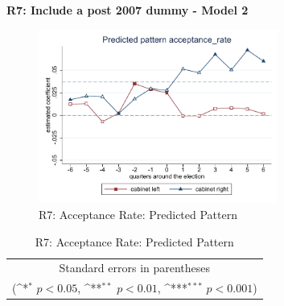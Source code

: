\documentclass[10pt,a4paper]{scrartcl}
\begin{document}
\clearpage
\textbf{R7: Include a post 2007 dummy - Model 2}
\begin{figure}[!ht]
	\centering
	\includegraphics[width=0.7\textwidth]{figures_edited/acceptance_rate_graph2_R7.pdf}
	\caption{R7: Acceptance Rate: Predicted Pattern}
\end{figure}

\begin{table}[!ht]\centering
	\footnotesize
	\renewcommand{\arraystretch}{1.2}
	\def\sym#1{\ifmmode^{#1}\else\(^{#1}\)\fi}
	\caption{R7: Acceptance Rate: Predicted Pattern}
	\begin{tabular}{l*{2}{c}}
		\hline\hline
		
		\hline\hline
		\multicolumn{3}{c}{\footnotesize Standard errors in parentheses} \\
		\multicolumn{3}{c}{\footnotesize (\sym{*} \(p<0.05\), \sym{**} \(p<0.01\), \sym{***} \(p<0.001\))} \\
	\end{tabular}
\end{table}




\clearpage
\FloatBarrier
\end{document}

